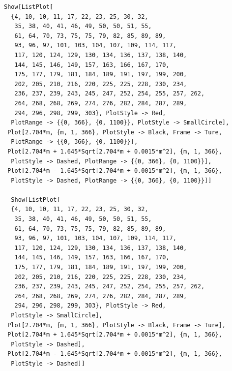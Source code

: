 \documentclass[a4paper]{article}
\begin{document}
\begin{lstlisting}
Show[ListPlot[
  {4, 10, 10, 11, 17, 22, 23, 25, 30, 32,
   35, 38, 40, 41, 46, 49, 50, 50, 51, 55,
   61, 64, 70, 73, 75, 75, 79, 82, 85, 89, 89,
   93, 96, 97, 101, 103, 104, 107, 109, 114, 117,
   117, 120, 124, 129, 130, 134, 136, 137, 138, 140,
   144, 145, 146, 149, 157, 163, 166, 167, 170,
   175, 177, 179, 181, 184, 189, 191, 197, 199, 200,
   202, 205, 210, 216, 220, 225, 225, 228, 230, 234,
   236, 237, 239, 243, 245, 247, 252, 254, 255, 257, 262,
   264, 268, 268, 269, 274, 276, 282, 284, 287, 289,
   294, 296, 298, 299, 303}, PlotStyle -> Red, 
  PlotRange -> {{0, 366}, {0, 1100}}, PlotStyle -> SmallCircle], 
 Plot[2.704*m, {m, 1, 366}, PlotStyle -> Black, Frame -> Ture, 
  PlotRange -> {{0, 366}, {0, 1100}}], 
 Plot[2.704*m + 1.645*Sqrt[2.704*m + 0.0015*m^2], {m, 1, 366}, 
  PlotStyle -> Dashed, PlotRange -> {{0, 366}, {0, 1100}}], 
 Plot[2.704*m - 1.645*Sqrt[2.704*m + 0.0015*m^2], {m, 1, 366}, 
  PlotStyle -> Dashed, PlotRange -> {{0, 366}, {0, 1100}}]]
  
  Show[ListPlot[
  {4, 10, 10, 11, 17, 22, 23, 25, 30, 32,
   35, 38, 40, 41, 46, 49, 50, 50, 51, 55,
   61, 64, 70, 73, 75, 75, 79, 82, 85, 89, 89,
   93, 96, 97, 101, 103, 104, 107, 109, 114, 117,
   117, 120, 124, 129, 130, 134, 136, 137, 138, 140,
   144, 145, 146, 149, 157, 163, 166, 167, 170,
   175, 177, 179, 181, 184, 189, 191, 197, 199, 200,
   202, 205, 210, 216, 220, 225, 225, 228, 230, 234,
   236, 237, 239, 243, 245, 247, 252, 254, 255, 257, 262,
   264, 268, 268, 269, 274, 276, 282, 284, 287, 289,
   294, 296, 298, 299, 303}, PlotStyle -> Red, 
  PlotStyle -> SmallCircle], 
 Plot[2.704*m, {m, 1, 366}, PlotStyle -> Black, Frame -> Ture], 
 Plot[2.704*m + 1.645*Sqrt[2.704*m + 0.0015*m^2], {m, 1, 366}, 
  PlotStyle -> Dashed], 
 Plot[2.704*m - 1.645*Sqrt[2.704*m + 0.0015*m^2], {m, 1, 366}, 
  PlotStyle -> Dashed]]
\end{lstlisting}
\end{document}
